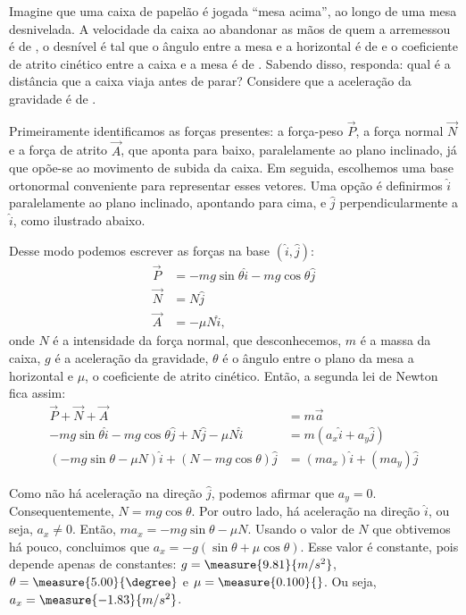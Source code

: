 \begin{question}
	Imagine que uma caixa de papelão é jogada ``mesa acima'', ao longo de uma mesa desnivelada.
	A velocidade da caixa ao abandonar as mãos de quem a arremessou é de , o desnível é tal que o ângulo entre a mesa e a horizontal é de  e o coeficiente de atrito cinético entre a caixa e a mesa é de .
	Sabendo disso, responda: qual é a distância que a caixa viaja antes de parar?
	Considere que a aceleração da gravidade é de .

	\begin{answer}
	\end{answer}

	\begin{solution}
		Primeiramente identificamos as forças presentes: a força-peso $\vec P$, a força normal $\vec N$ e a força de atrito $\vec A$, que aponta para baixo, paralelamente ao plano inclinado, já que opõe-se ao movimento de subida da caixa.
		Em seguida, escolhemos uma base ortonormal conveniente para representar esses vetores.
		Uma opção é definirmos $\hat i$ paralelamente ao plano inclinado, apontando para cima, e $\hat j$ perpendicularmente a $\hat i$, como ilustrado abaixo.


		Desse modo podemos escrever as forças na base $(\hat i, \hat j)$:
		\begin{align*}
			\vec P &= -mg\sin\theta\hat i - mg\cos\theta\hat j \\
			\vec N &= N\hat j \\
			\vec A &= -\mu N \hat i,
		\end{align*}
		onde $N$ é a intensidade da força normal, que desconhecemos, $m$ é a massa da caixa, $g$ é a aceleração da gravidade, $\theta$ é o ângulo entre o plano da mesa a horizontal e $\mu$, o coeficiente de atrito cinético.
		Então, a segunda lei de Newton fica assim:
		\begin{align*}
			\vec P + \vec N + \vec A &= m \vec a \\
			-mg\sin\theta\hat i - mg\cos\theta\hat j + N\hat j -\mu N \hat i &= m (a_x \hat i + a_y \hat j) \\
			(-mg\sin\theta - \mu N) \hat i + (N  - mg\cos\theta)\hat j &= (m a_x)\hat i + (m a_y) \hat j
		\end{align*}

		Como não há aceleração na direção $\hat j$, podemos afirmar que $a_y = 0$.
		Consequentemente, $N = mg\cos\theta$.
		Por outro lado, há aceleração na direção $\hat i$, ou seja, $a_x \ne 0$.
		Então, $ma_x = -mg\sin\theta - \mu N$.
		Usando o valor de $N$ que obtivemos há pouco, concluimos que $a_x = -g(\sin\theta + \mu \cos\theta)$.
		Esse valor é constante, pois depende apenas de constantes: $g = \measure{9.81}{m/s^2}$, $\theta = \measure{5.00}{\degree}$ e $\mu = \measure{0.100}{}$.
		Ou seja, $a_x = \measure{-1.83}{m/s^2}$.


\end{solution}
\end{question}
